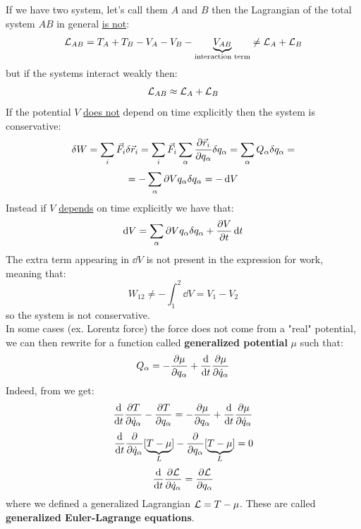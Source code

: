 If we have two system, let's call them $A$ and $B$ then the Lagrangian of the total system $AB$ in general \underline{is not}:
\begin{equation}
    \mathcal{L}_{AB} = T_A + T_B - V_A - V_B - \underbrace{V_{AB}}_{\text{interaction term}}\neq \mathcal{L}_A + \mathcal{L}_B
\end{equation}
but if the systems interact weakly then:
\begin{equation}
    \mathcal{L}_{AB} \approx \mathcal{L}_A + \mathcal{L}_B
\end{equation}
If the potential $V$ \underline{does not} depend on time explicitly then the system is conservative:
\begin{equation}
    \delta W = \displaystyle\sum_i \vec{F}_i \delta \vec{r}_i = \displaystyle\sum_i \vec{F}_i \displaystyle\sum_{\alpha}\dfrac{\partial \vec{r}_i}{\partial q_{\alpha}}\delta q_{\alpha} = \displaystyle\sum_{\alpha} Q_{\alpha}\delta q_{\alpha} =
\end{equation}
\begin{equation}
    = -\displaystyle\sum_{\alpha} \partial{V}{q_{\alpha}}\delta q_{\alpha} = -\dd{V}
\end{equation}
Instead if $V$ \underline{depends} on time explicitly we have that:
\begin{equation}
    \dd{V} = \displaystyle\sum_{\alpha} \partial{V}{q_{\alpha}}\delta q_{\alpha} + \dfrac{\partial V}{\partial t}\dd{t}
\end{equation}
The extra term appearing in $\dd{V}$ is not present in the expression for work, meaning that:
\begin{equation}
    W_{12} \neq -\int_{1}^{2}\dd{V} = V_1 - V_2
\end{equation}
so the system is not conservative.\\
In some cases (ex. Lorentz force) the force does not come from a "real" potential, we can then rewrite \eleref\;for a function called \textbf{generalized potential} $\mu$ such that:
\begin{equation}
    Q_{\alpha} = -\dfrac{\partial \mu}{\partial q_{\alpha}} +\dv{}{t}\dfrac{\partial \mu}{\partial \dot{q}_{\alpha}}
\end{equation}
Indeed, from \lagrangeref\;we get:
\begin{equation}
    \dv{}{t}\dfrac{\partial T}{\partial \dot{q}_{\alpha}} - \dfrac{\partial T}{\partial q_{\alpha}} = -\dfrac{\partial \mu}{\partial q_{\alpha}} +\dv{}{t}\dfrac{\partial \mu}{\partial \dot{q}_{\alpha}}
\end{equation}
\begin{equation}
    \dv{}{t}\dfrac{\partial }{\partial \dot{q}_{\alpha}}[\underbrace{T-\mu}_L] - \dfrac{\partial}{\partial q_{\alpha}}[\underbrace{T-\mu}_L] = 0
\end{equation}
\begin{equation}
    \dv{}{t}\pdv{\lagr}{\dot{q}_{\alpha}} = \pdv{\lagr}{q_{\alpha}}
\end{equation}
where we defined a generalized Lagrangian $\mathcal{L} = T-\mu$. These are called \textbf{generalized Euler-Lagrange equations}.
